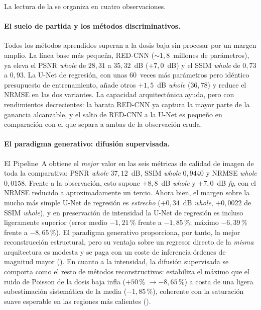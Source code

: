 La lectura de la  se organiza en cuatro
observaciones.

\paragraph{El suelo de partida y los métodos discriminativos.}
Todos los métodos aprendidos superan a la dosis baja sin procesar por
un margen amplio. La línea base más pequeña, RED-CNN
($\sim 1{,}8$~millones de parámetros), ya eleva el PSNR \textit{whole}
de $28{,}31$ a $35{,}32$~dB ($+7{,}0$~dB) y el SSIM \textit{whole} de
$0{,}73$ a $0{,}93$. La U-Net de regresión, con unas 60~veces más
parámetros pero idéntico presupuesto de entrenamiento, añade otros
$+1{,}5$~dB \textit{whole} ($36{,}78$) y reduce el NRMSE en las dos
variantes. La capacidad arquitectónica ayuda, pero con rendimientos
decrecientes: la barata RED-CNN ya captura la mayor parte de la
ganancia alcanzable, y el salto de RED-CNN a la U-Net es pequeño en
comparación con el que separa a ambas de la observación cruda.

\paragraph{El paradigma generativo: difusión supervisada.}
El Pipeline~A obtiene el \emph{mejor} valor en las seis métricas de
calidad de imagen de toda la comparativa: PSNR \textit{whole}
$37{,}12$~dB, SSIM \textit{whole} $0{,}9440$ y NRMSE \textit{whole}
$0{,}0158$. Frente a la observación, esto supone $+8{,}8$~dB
\textit{whole} y $+7{,}0$~dB \textit{fg}, con el NRMSE reducido a
aproximadamente un tercio. Ahora bien, el margen sobre la mucho más
simple U-Net de regresión es \emph{estrecho}
($+0{,}34$~dB \textit{whole}, $+0{,}0022$ de SSIM \textit{whole}), y
en preservación de intensidad la U-Net de regresión es incluso
ligeramente superior (error medio $-1{,}21$\,\% frente a
$-1{,}85$\,\%; máximo $-6{,}39$\,\% frente a $-8{,}65$\,\%). El
paradigma generativo proporciona, por tanto, la mejor reconstrucción
estructural, pero su ventaja sobre un regresor directo de la
\emph{misma} arquitectura es modesta y se paga con un coste de
inferencia órdenes de magnitud mayor (). En
cuanto a la intensidad, la difusión supervisada se comporta como el
resto de métodos reconstructivos: estabiliza el máximo que el ruido
de Poisson de la dosis baja infla ($+50$\,\% $\to -8{,}65$\,\%) a
costa de una ligera subestimación sistemática de la media
($-1{,}85$\,\%), coherente con la saturación suave esperable en las
regiones más calientes ().


